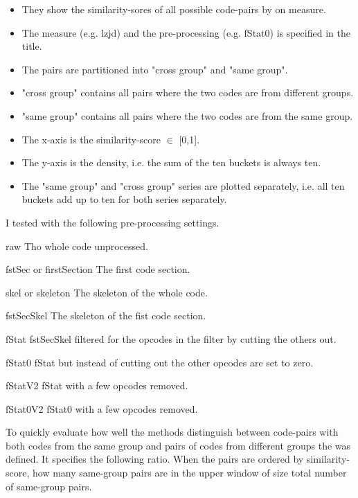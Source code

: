 \documentclass[../main.tex]{subfiles}
\begin{document}
\begin{itemize}
  \item They show the similarity-sores of all possible code-pairs by on measure.
  \item The measure (e.g. lzjd) and the pre-processing (e.g. fStat0) is specified in the title.
  \item The pairs are partitioned into "cross group" and "same group".
  \item "cross group" contains all pairs where the two codes are from different groups.
  \item "same group" contains all pairs where the two codes are from the same group.
  \item The x-axis is the similarity-score \(\in\) [0,1].
  \item The y-axis is the density, i.e. the sum of the ten buckets is always ten.
  \item The "same group" and "cross group" series are plotted separately, i.e. all ten buckets add up to ten for both series separately.
\end{itemize}

I tested with the following pre-processing settings.

\begin{desc}
  \item[raw] Tho whole code unprocessed.
  \item[fstSec or firstSection] The first code section.
  \item[skel or skeleton] The skeleton of the whole code.
  \item[fstSecSkel] The skeleton of the fist code section.
  \item[fStat] fstSecSkel filtered for the opcodes in the  filter by cutting the others out.
  \item[fStat0] fStat but instead of cutting out the other opcodes are set to zero.
  \item[fStatV2] fStat with a few opcodes removed.
  \item[fStat0V2] fStat0 with a few opcodes removed.
\end{desc}

To quickly evaluate how well the methods distinguish between code-pairs with both codes from the same group and pairs of codes from different groups the  was defined.
It specifies the following ratio.
When the pairs are ordered by similarity-score, how many same-group pairs are in the upper window of size total number of same-group pairs.
\end{document}
